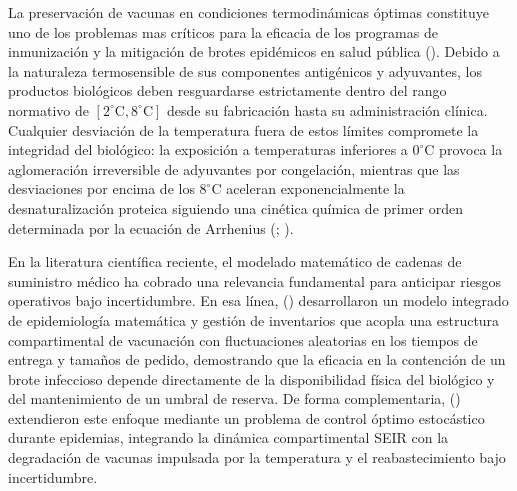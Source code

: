 \documentclass[
  spanish,
  us-letterpaper,
]{scrreprt}
\numberwithin{equation}{section}
\theoremstyle{plain}
\theoremstyle{plain}
\theoremstyle{plain}
\theoremstyle{definition}
\theoremstyle{remark}
\begin{document}
La preservación de vacunas en condiciones termodinámicas óptimas
constituye uno de los problemas mas críticos para la eficacia de los
programas de inmunización y la mitigación de brotes epidémicos en salud
pública (). Debido a la naturaleza termosensible de sus componentes
antigénicos y adyuvantes, los productos biológicos deben resguardarse
estrictamente dentro del rango normativo de
\([2^\circ\text{C}, 8^\circ\text{C}]\) desde su fabricación hasta su
administración clínica. Cualquier desviación de la temperatura fuera de
estos límites compromete la integridad del biológico: la exposición a
temperaturas inferiores a \(0^\circ\text{C}\) provoca la aglomeración
irreversible de adyuvantes por congelación, mientras que las
desviaciones por encima de los \(8^\circ\text{C}\) aceleran
exponencialmente la desnaturalización proteica siguiendo una cinética
química de primer orden determinada por la ecuación de Arrhenius
(;
).

En la literatura científica reciente, el modelado matemático de cadenas
de suministro médico ha cobrado una relevancia fundamental para
anticipar riesgos operativos bajo incertidumbre. En esa línea,
() desarrollaron un modelo integrado de epidemiología
matemática y gestión de inventarios que acopla una estructura
compartimental de vacunación con fluctuaciones aleatorias en los tiempos
de entrega y tamaños de pedido, demostrando que la eficacia en la
contención de un brote infeccioso depende directamente de la
disponibilidad física del biológico y del mantenimiento de un umbral de
reserva. De forma complementaria,
() extendieron este enfoque mediante un problema de control óptimo
estocástico durante epidemias, integrando la dinámica compartimental
SEIR con la degradación de vacunas impulsada por la temperatura y el
reabastecimiento bajo incertidumbre.
\end{document}
